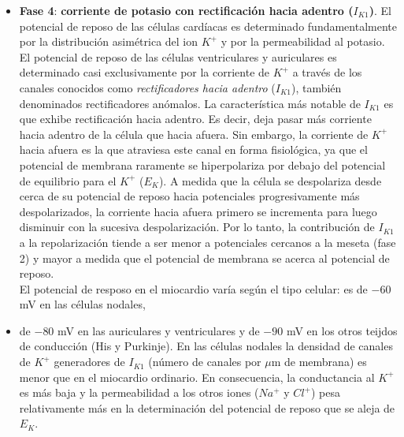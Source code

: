 \begin{itemize}
        \item \textbf{Fase 4}: \textbf{corriente de potasio con rectificación hacia adentro ($I_{K1}$)}. El potencial de reposo de las células cardíacas es determinado fundamentalmente por la distribución asimétrica del ion $K^+$ y por la permeabilidad al potasio. El potencial de reposo de las células ventriculares y auriculares es determinado casi exclusivamente por la corriente de $K^+$ a través de los canales conocidos como \textit{rectificadores hacia adentro} ($I_{K1}$), también denominados rectificadores anómalos. La característica más notable de $I_{K1}$ es que exhibe rectificación hacia adentro. Es decir, deja pasar más corriente hacia adentro de la célula que hacia afuera. Sin embargo, la corriente de $K^+$ hacia afuera es la que atraviesa este canal en forma fisiológica, ya que el potencial de membrana raramente se hiperpolariza por debajo del potencial de equilibrio para el $K^+$ ($E_K$). A medida que la célula se despolariza desde cerca de su potencial de reposo hacia potenciales progresivamente más despolarizados, la corriente hacia afuera primero se incrementa para luego disminuir con la sucesiva despolarización. Por lo tanto, la contribución de $I_{K1}$ a la repolarización tiende a ser menor a potenciales cercanos a la meseta (fase 2) y mayor a medida que el potencial de membrana se acerca al potencial de reposo. \\
        El potencial de resposo en el miocardio varía según el tipo celular: es de $-60$ mV en las células nodales,
        \item de $-80$ mV en las auriculares y ventriculares y de $-90$ mV en los otros teijdos de conducción (His y Purkinje). En las células nodales la densidad de canales de $K^+$ generadores de $I_{K1}$ (número de canales por $\mu$m de membrana) es menor que en el miocardio ordinario. En consecuencia, la conductancia al $K^+$ es más baja y la permeabilidad a los otros iones ($Na^+$ y $Cl^+$) pesa relativamente más en la determinación del potencial de reposo que se aleja de $E_K$.
    \end{itemize}
    
